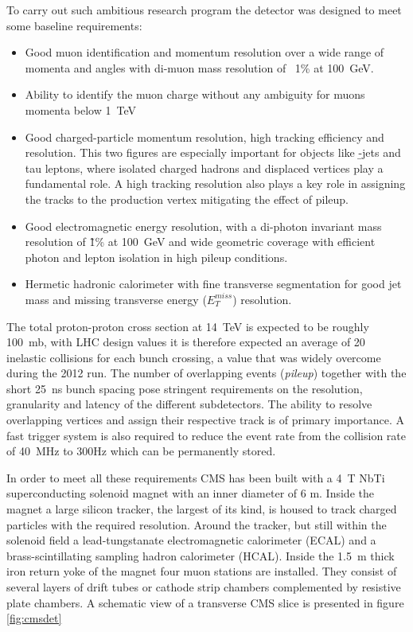 To carry out such ambitious research program the detector was designed to meet some baseline requirements:
\begin{itemize}
\item Good muon identification and momentum resolution over a wide range of momenta and angles with di-muon mass resolution of ~1\% at 100~GeV.
\item Ability to identify the muon charge without any ambiguity for muons momenta below 1~TeV
\item Good charged-particle momentum resolution, high tracking efficiency and resolution. This two figures are especially important for objects like \b-jets and tau leptons, where isolated charged hadrons and displaced vertices play a fundamental role. A high tracking resolution also plays a key role in assigning the tracks to the production vertex mitigating the effect of pileup.
\item Good electromagnetic energy resolution, with a di-photon invariant mass resolution of \~1\% at 100~GeV and wide geometric coverage with efficient photon and lepton isolation in high pileup conditions.
\item Hermetic hadronic calorimeter with fine transverse segmentation for good jet mass and missing transverse energy ($E_T^{miss}$) resolution. 
\end{itemize}

The total proton-proton cross section at 14~TeV is expected to be roughly 100~mb, with LHC design values it is therefore expected an average of 20 inelastic collisions for each bunch crossing, a value that was widely overcome during the 2012 run. The number of overlapping events (\emph{pileup}) together with the short 25~ns bunch spacing pose stringent requirements on the resolution, granularity and latency of the different subdetectors. The ability to resolve overlapping vertices and assign their respective track is of primary importance. A fast trigger system is also required to reduce the event rate from the collision rate of 40~MHz to 300Hz which can be permanently stored.

In order to meet all these requirements CMS has been built with a 4~T NbTi superconducting solenoid magnet with an inner diameter of 6 m. Inside the magnet a large silicon tracker, the largest of its kind, is housed to track charged particles with the required resolution. Around the tracker, but still within the solenoid field a lead-tungstanate electromagnetic calorimeter (ECAL) and a brass-scintillating sampling hadron calorimeter (HCAL). Inside the 1.5~m thick iron return yoke of the magnet four muon stations are installed. They consist of several layers of drift tubes or cathode strip chambers complemented by resistive plate chambers. A schematic view of a transverse CMS slice is presented in figure \ref{fig:cmsdet}

